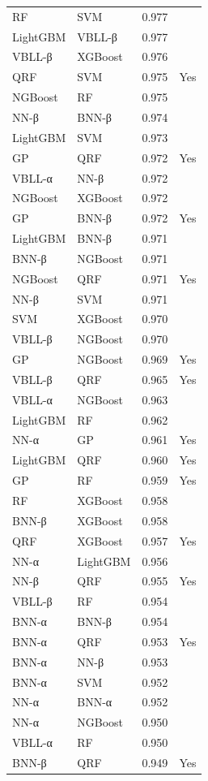 \begin{tabular}{llrl}
RF & SVM & 0.977 &  \\
LightGBM & VBLL-β & 0.977 &  \\
VBLL-β & XGBoost & 0.976 &  \\
QRF & SVM & 0.975 & Yes \\
NGBoost & RF & 0.975 &  \\
NN-β & BNN-β & 0.974 &  \\
LightGBM & SVM & 0.973 &  \\
GP & QRF & 0.972 & Yes \\
VBLL-α & NN-β & 0.972 &  \\
NGBoost & XGBoost & 0.972 &  \\
GP & BNN-β & 0.972 & Yes \\
LightGBM & BNN-β & 0.971 &  \\
BNN-β & NGBoost & 0.971 &  \\
NGBoost & QRF & 0.971 & Yes \\
NN-β & SVM & 0.971 &  \\
SVM & XGBoost & 0.970 &  \\
VBLL-β & NGBoost & 0.970 &  \\
GP & NGBoost & 0.969 & Yes \\
VBLL-β & QRF & 0.965 & Yes \\
VBLL-α & NGBoost & 0.963 &  \\
LightGBM & RF & 0.962 &  \\
NN-α & GP & 0.961 & Yes \\
LightGBM & QRF & 0.960 & Yes \\
GP & RF & 0.959 & Yes \\
RF & XGBoost & 0.958 &  \\
BNN-β & XGBoost & 0.958 &  \\
QRF & XGBoost & 0.957 & Yes \\
NN-α & LightGBM & 0.956 &  \\
NN-β & QRF & 0.955 & Yes \\
VBLL-β & RF & 0.954 &  \\
BNN-α & BNN-β & 0.954 &  \\
BNN-α & QRF & 0.953 & Yes \\
BNN-α & NN-β & 0.953 &  \\
BNN-α & SVM & 0.952 &  \\
NN-α & BNN-α & 0.952 &  \\
NN-α & NGBoost & 0.950 &  \\
VBLL-α & RF & 0.950 &  \\
BNN-β & QRF & 0.949 & Yes \\

\end{tabular}
